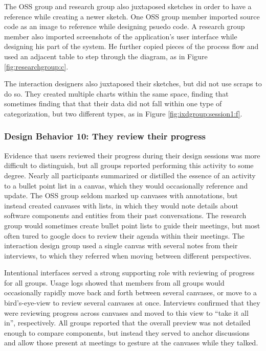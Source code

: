 The OSS group and research group also juxtaposed sketches in order to have a reference while creating a newer sketch. One OSS group member imported source code as an image to reference while designing psuedo code. A research group member also imported screenshots of the application's user interface while designing his part of the system. He further copied pieces of the process flow and used an adjacent table to step through the diagram, as in Figure \ref{fig:researchgroup:c}.

The interaction designers also juxtaposed their sketches, but did not use scraps to do so. They created multiple charts within the same space, finding that sometimes finding that that their data did not fall within one type of categorization, but two different types, as in Figure \ref{fig:ixdgroup:session1:f}. 

\subsubsection{Design Behavior 10: They review their progress}

Evidence that users reviewed their progress during their design sessions was more difficult to distinguish, but all groups reported performing this activity to some degree. Nearly all participants summarized or distilled the essence of an activity to a bullet point list in a canvas, which they would occasionally reference and update. The OSS group seldom marked up canvases with annotations, but instead created canvases with lists, in which they would note details about software components and entities from their past conversations. The research group would sometimes create bullet point lists to guide their meetings, but most often tured to google docs to review their agenda within their meetings. The interaction design group used a single canvas with several notes from their interviews, to which they referred when moving between different perspectives. 

Intentional interfaces served a strong supporting role with reviewing of progress for all groups. Usage logs showed that members from all groups would occasionally rapidly move back and forth between several canvases, or move to a bird's-eye-view to review several canvases at once. Interviews confirmed that they were reviewing progress across canvases and moved to this view to ``take it all in'', respectively. All groups reported that the overall preview was not detailed enough to compare components, but instead they served to anchor discussions and allow those present at meetings to gesture at the canvases while they talked.

